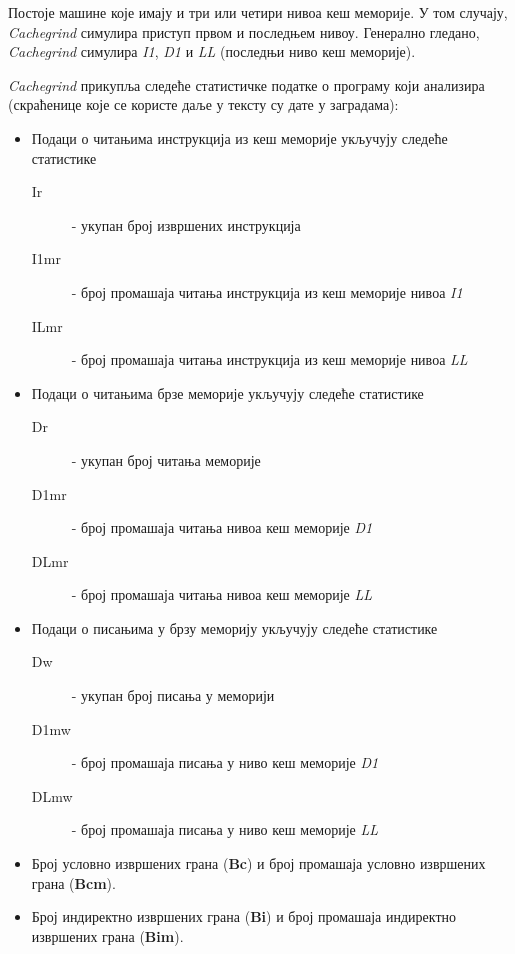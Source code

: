 \documentclass[12pt,oneside]{memoir}
\begin{document}
\indent Постоје машине које имају и три или четири нивоа кеш меморије. У том случају, \textit{Cachegrind} симулира приступ првом и последњем нивоу. Генерално гледано, \textit{Cachegrind} симулира  \textit{I1}, \textit{D1} и \textit{LL} (последњи ниво кеш меморије).

\indent \textit{Cachegrind} прикупља следеће статистичке податке о програму који анализира (скраћенице које се користе даље у тексту су дате у заградама):

\begin{itemize}
	\item  Подаци о читањима инструкција из кеш меморије укључују следеће статистике
\begin{description}
	\item[Ir] - укупан број извршених инструкција
	\item[I1mr] - број промашаја читања инструкција из кеш меморије нивоа \textit{I1}
	\item[ILmr] - број промашаја читања инструкција из кеш меморије нивоа \textit{LL}
\end{description}
	\item Подаци о читањима брзе меморије укључују следеће статистике
\begin{description}
	\item[Dr] - укупан број читања меморије
	\item[D1mr] - број промашаја читања нивоа кеш меморије \textit{D1}
	\item[DLmr] - број промашаја читања нивоа кеш меморије \textit{LL}
\end{description}
	\item Подаци о писањима у брзу меморију укључују следеће статистике
\begin{description}
	\item[Dw] - укупан број писања у меморији
	\item[D1mw] - број промашаја писања у ниво кеш меморије \textit{D1}
	\item[DLmw] - број промашаја писања у ниво кеш меморије \textit{LL}
\end{description}
	\item Број условно извршених грана (\textbf{Bc}) и број промашаја условно извршених грана (\textbf{Bcm}).
	\item Број индиректно извршених грана (\textbf{Bi}) и број промашаја индиректно извршених грана (\textbf{Bim}).
\end{itemize}
    
   
\end{document}
